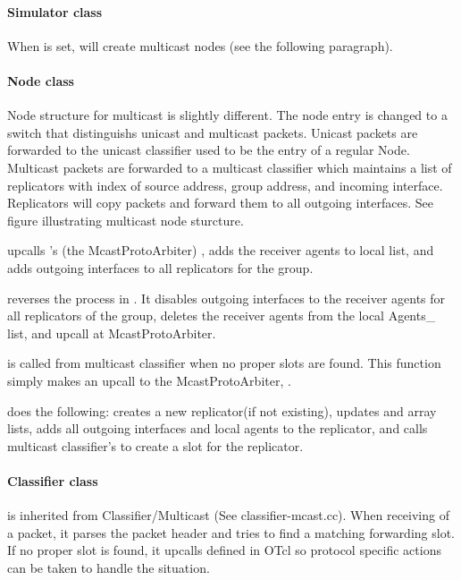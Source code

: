\paragraph{Simulator class}
When  is set,  will create multicast
nodes (see the following paragraph).

\paragraph{Node class}
Node structure for multicast is slightly different.  The node entry is
changed to a switch that distinguishs unicast and multicast packets.
Unicast packets are forwarded to the unicast classifier used to be the
entry of a regular Node.  Multicast packets are forwarded to a multicast
classifier which maintains a list of replicators with index of source
address, group address, and incoming interface. Replicators will copy
packets and forward them to all outgoing interfaces. See figure
illustrating multicast node sturcture.

 upcalls 's (the McastProtoArbiter)
, adds the receiver agents to local  list,
and adds outgoing interfaces to all replicators for the group.

 reverses the process in .  It disables
outgoing interfaces to the receiver agents for all replicators of the
group, deletes the receiver agents from the local Agents_ list, and upcall
 at McastProtoArbiter.

 is called from multicast classifier when no proper slots
are found.  This function simply makes an upcall to the McastProtoArbiter,
.

 does the following: creates a new replicator(if not
existing), updates  and  array lists,
adds all outgoing interfaces and local agents to the replicator, and calls
multicast classifier's  to create a slot for the replicator.

\paragraph{Classifier class}
 is inherited from
Classifier/Multicast (See classifier-mcast.cc).  When receiving of a
packet, it parses the packet header and tries to find a matching
forwarding slot. If no proper slot is found, it upcalls 
defined in OTcl so protocol specific actions can be taken to handle the
situation.

